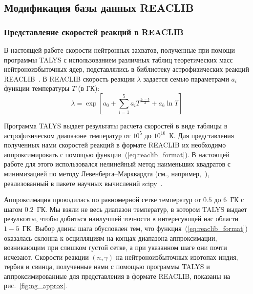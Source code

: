 \subsection{Модификация базы данных REACLIB} \label{sec:ratelib}
\subsubsection{Представление скоростей реакций в REACLIB}
В настоящей работе скорости нейтронных захватов, полученные при помощи программы TALYS с использованием различных таблиц теоретических масс нейтроноизбыточных ядер, подставлялись в библиотеку астрофизических реакций REACLIB~\cite{reaclib2010}. В REACLIB скорость реакции $\lambda$ задается семью параметрами $a_i$ функции температуры $T$ (в ГК):
\begin{equation}
    \lambda = \exp \left[ a_0 + \sum_{i=1}^5 a_i T^{\frac{2i-5}{3}} + a_6 \ln T \right]
    \label{eq:reaclib_format}
\end{equation}

Программа TALYS выдает результаты расчета скоростей в виде таблицы в астрофизическом диапазоне температур от $10^5$ до $10^{10}$~К. Для представления полученных нами скоростей реакций в формате REACLIB их необходимо аппроксимировать с помощью функции~(\ref{eq:reaclib_format}). В настоящей работе для этого использовался нелинейный метод наименьших квадратов с минимизацией по методу Левенберга--Марквардта (см., например,~\cite{levenberg1944}), реализованный в пакете научных вычислений scipy~\cite{scipy2020}. 

Аппроксимация проводилась по равномерной сетке температур от $0.5$ до $6$~ГК с шагом $0.2$~ГК. Мы взяли не весь диапазон температур, в котором TALYS выдает результаты, чтобы добиться наилучшей точности в интересующей нас области $1-5$~ГК. Выбор длины шага обусловлен тем, что функция~(\ref{eq:reaclib_format}) оказалась склонна к осцилляциям на концах диапазона аппроксимации, возникающим при слишком густой сетке, а при указанном шаге они почти исчезают. Скорости реакции $(n,\gamma)$ на нейтроноизбыточных изотопах индия, тербия и свинца, полученные нами с помощью программы TALYS и аппроксимированные для представления в формате REACLIB, показаны на рис.~\ref{fig:ng_approx}. 

